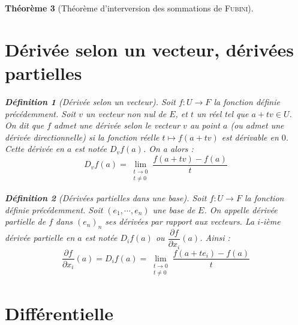 \documentclass[11pt,a4paper]{report}
\newtheorem{theorem}{Théorème}[chapter]
\theoremstyle{definition}
\newtheorem{dfn}[theorem]{Définition}
\begin{document}
\begin{theorem}[Théorème d'interversion des sommations de \textsc{Fubini}]
{{\section{Dérivée selon un vecteur, dérivées partielles} %
\label{sec:derivee_selon_un_vecteur_derivees_partielles}
\begin{dfn}[Dérivée selon un vecteur]
     Soit $f:U\to F$ la fonction définie précédemment.\newline
    Soit $v$ un vecteur non nul de $E$, et $t$ un réel tel que $a+tv \in U$. \\
    On dit que $f$ \emph{admet une dérivée selon le vecteur $v$ au point $a$} (ou admet une \emph{dérivée directionnelle}) si la fonction réelle $t\mapsto f(a+tv)$ est dérivable en $0$. Cette dérivée en $a$ est notée $D_vf(a)$. \newline
    On a alors : 
    \begin{equation}
    D_vf(a)=\lim_{\substack{t\rightarrow 0\\ t\neq 0}}\dfrac{f(a+tv) - f(a)}{t}
    \end{equation}
\end{dfn}
\begin{dfn}[Dérivées partielles dans une base]
     Soit $f:U\to F$ la fonction définie précédemment.\newline
     Soit $(e_1, \cdots ,e_n)$ une base de $E$. On appelle \emph{dérivée partielle} de $f$ dans $(e_n)_n$ ses dérivées par rapport aux vecteurs. La $i$-ième dérivée partielle en $a$ est notée $D_if(a)$ ou $\dfrac{\partial f}{\partial x_i}(a)$. Ainsi : 
     \begin{equation}
     \dfrac{\partial f}{\partial x_i}(a)=D_if(a)=\lim_{\substack{t\rightarrow 0\\ t\neq 0}}\dfrac{f(a+te_i) - f(a)}{t}
     \end{equation}
\end{dfn}


\section{Différentielle} %
\label{sec:differentielle}
}}
\end{theorem}
\end{document}
